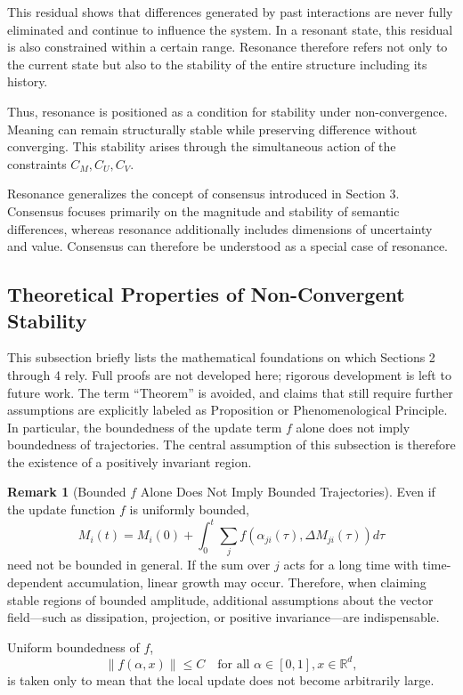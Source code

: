 \documentclass[11pt,a4paper]{article}
\theoremstyle{definition}
\newtheorem{remark}{Remark}[section]
\begin{document}
This residual shows that differences generated by past interactions are never fully eliminated and continue to influence the system. In a resonant state, this residual is also constrained within a certain range. Resonance therefore refers not only to the current state but also to the stability of the entire structure including its history.

Thus, resonance is positioned as a condition for stability under non-convergence. Meaning can remain structurally stable while preserving difference without converging. This stability arises through the simultaneous action of the constraints $C_M, C_U, C_V$.

Resonance generalizes the concept of consensus introduced in Section 3. Consensus focuses primarily on the magnitude and stability of semantic differences, whereas resonance additionally includes dimensions of uncertainty and value. Consensus can therefore be understood as a special case of resonance.

\subsection{Theoretical Properties of Non-Convergent Stability}

This subsection briefly lists the mathematical foundations on which Sections 2 through 4 rely. Full proofs are not developed here; rigorous development is left to future work. The term ``Theorem'' is avoided, and claims that still require further assumptions are explicitly labeled as Proposition or Phenomenological Principle. In particular, the boundedness of the update term $f$ alone does not imply boundedness of trajectories. The central assumption of this subsection is therefore the existence of a positively invariant region.

\begin{remark}[Bounded $f$ Alone Does Not Imply Bounded Trajectories]
Even if the update function $f$ is uniformly bounded,
\[
M_i(t) = M_i(0) + \int_0^t \sum_j f(\alpha_{ji}(\tau), \Delta M_{ji}(\tau)) d\tau
\]
need not be bounded in general. If the sum over $j$ acts for a long time with time-dependent accumulation, linear growth may occur. Therefore, when claiming stable regions of bounded amplitude, additional assumptions about the vector field---such as dissipation, projection, or positive invariance---are indispensable.

Uniform boundedness of $f$,
\[
\|f(\alpha, x)\| \leq C \quad \text{for all } \alpha \in [0,1], x \in \mathbb{R}^d,
\]
is taken only to mean that the local update does not become arbitrarily large.
\end{remark}
\end{document}
